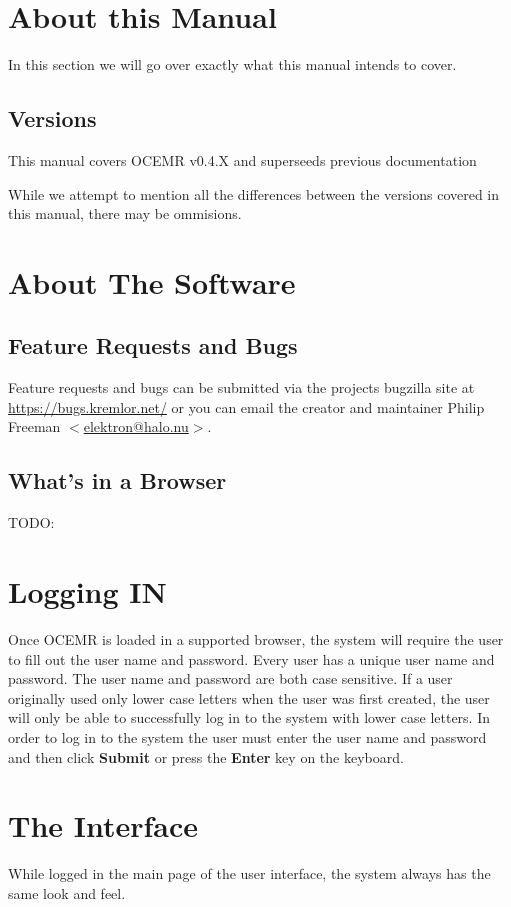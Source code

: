 \section{About this Manual}

In this section we will go over exactly what this manual intends to cover.

\subsection{Versions}
This manual covers OCEMR v0.4.X and superseeds previous documentation

While we attempt to mention all the differences between the versions
covered in this manual, there may be ommisions.

\section{About The Software}



\subsection{Feature Requests and Bugs}
Feature requests and bugs can be submitted via the projects bugzilla site at
\url{https://bugs.kremlor.net/} or you can email the creator and maintainer
Philip Freeman $<$\href{mailto:elektron@halo.nu}{elektron@halo.nu}$>$.

\subsection{What's in a Browser}
TODO:

\section{Logging IN}
Once OCEMR is loaded in a supported browser, the
system will require the user to fill out the user name and password.
Every user has a unique user name and password. The user name and
password are both case sensitive. If a user originally used only lower
case letters when the user was first created, the user will only be
able to successfully log in to the system with lower case letters. In
order to log in to the system the user must enter the user name and
password and then click \textbf{Submit }or press the \textbf{Enter} key
on the keyboard.

\section{The Interface}
While logged in the main page of the user interface, the system
always has the same look and feel. 
